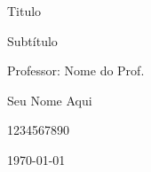 \documentclass[]{abntex2}
\renewcommand{\titulo}{Titulo}
\newcommand{\subt}{Subtítulo}
\renewcommand{\autor}{Seu Nome Aqui}
\newcommand{\matricula}{1234567890}
\newcommand{\professor}{Nome do Prof.}
\begin{document}
\vspace*{0,75cm}

\begingroup
\fontsize{100pt}{12pt}\selectfont
	\begin{center}
		\titulo
		
		\vspace*{2cm}
		
		\subt
	\end{center}
\endgroup

\vspace*{1cm}

\begin{center}
	{\huge Professor: \professor}
\end{center}

\vspace*{8cm}

\begin{flushright}
	{\huge \autor} 
	
	\vspace*{0,25cm}
	
	{\huge \matricula}
\end{flushright}

\vspace*{\fill}

\begin{center}
	{\huge \today} 
\end{center}
\end{document}
